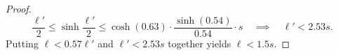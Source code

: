 \begin{proof}
    \begin{equation*}
        \frac{\ell'}{2} \le
        \sinh \frac{\ell'}{2} \le
        \cosh(0.63) \cdot \frac{\sinh(0.54)}{0.54} \cdot s
        \quad \implies \quad
        \ell' < 2.53 s.
    \end{equation*}
    Putting $\ell < 0.57\ell'$ and $\ell' < 2.53 s$ together yields $\ell < 1.5 s$.
%
%

\end{proof}
